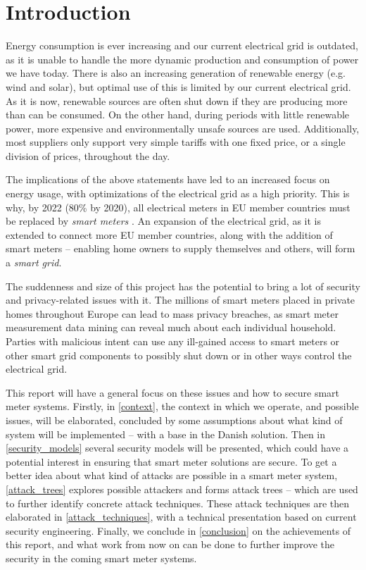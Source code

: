 
\chapter*{Introduction}

Energy consumption is ever increasing and our current electrical grid is outdated, as it is unable to handle the more dynamic production and consumption of power we have today.
There is also an increasing generation of renewable energy (e.g. wind and solar), but optimal use of this is limited by our current electrical grid.
As it is now, renewable sources are often shut down if they are producing more than can be consumed.
On the other hand, during periods with little renewable power, more expensive and environmentally unsafe sources are used.
Additionally, most suppliers only support very simple tariffs with one fixed price, or a single division of prices, throughout the day.

The implications of the above statements have led to an increased focus on energy usage, with optimizations of the electrical grid as a high priority.
This is why, by 2022 (80\% by 2020), all  electrical meters in EU member countries must be replaced by \emph{smart meters} \cite{smart_meter_survey, directive_2009_72_EC}.
An expansion of the electrical grid, as it is extended to connect more EU member countries, along with the addition of smart meters -- enabling home owners to supply themselves and others, will form a \emph{smart grid}.

The suddenness and size of this project has the potential to bring a lot of security and privacy-related issues with it.
The millions of smart meters placed in private homes throughout Europe can lead to mass privacy breaches, as smart meter measurement data mining can reveal much about each individual household.
Parties with malicious intent can use any ill-gained access to smart meters or other smart grid components to possibly shut down or in other ways control the electrical grid.

This report will have a general focus on these issues and how to secure smart meter systems.
Firstly, in \cref{context}, the context in which we operate, and possible issues, will be elaborated, concluded by some assumptions about what kind of system will be implemented -- with a base in the Danish solution.
Then in \cref{security_models} several security models will be presented, which could have a potential interest in ensuring that smart meter solutions are secure.
To get a better idea about what kind of attacks are possible in a smart meter system, \cref{attack_trees} explores possible attackers and forms attack trees -- which are used to further identify concrete attack techniques.
These attack techniques are then elaborated in \cref{attack_techniques}, with a technical presentation based on current security engineering.
Finally, we conclude in \cref{conclusion} on the achievements of this report, and what work from now on can be done to further improve the security in the coming smart meter systems.
